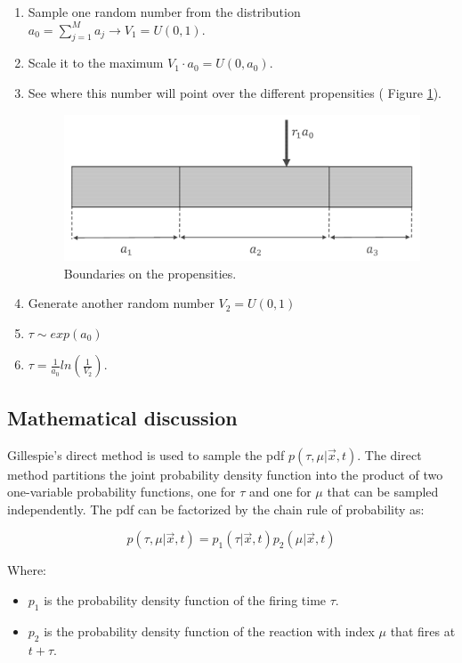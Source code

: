\begin{enumerate}
  \item Sample one random number from the distribution $a_0 = \sum_{j=1}^{M}{a_j}\rightarrow V_1=U(0,1)$.
  \item Scale it to the maximum $V_1 \cdot a_0 =U(0,a_0)$.
  \item See where this number will point over the different propensities ( Figure \ref{fig:boundaries}).

    \begin{figure}[H]
      \centering
      \includegraphics[width=\textwidth]{boundaries.png}
      \caption{Boundaries on the propensities.}
      \label{fig:boundaries}
    \end{figure}

  \item Generate another random number $V_2 =U(0,1)$ \item $\tau \sim exp(a_0)$ \item $\tau = \frac{1}{a_0}ln(\frac{1}{V_2})$.
\end{enumerate}

  \subsection{Mathematical discussion}
  Gillespie's direct method is used to sample the pdf $p(\tau, \mu|\vec{x},t)$.
  The direct method partitions the joint probability density function into the product of two one-variable probability functions, one for $\tau$ and one for $\mu$ that can be sampled independently.
  The pdf can be factorized by the chain rule of probability as:

  $$p(\tau, \mu|\vec{x},t) = p_1(\tau|\vec{x},t)p_2(\mu|\vec{x},t)$$

  Where:

  \begin{multicols}{2}
    \begin{itemize}
      \item $p_1$ is the probability density function of the firing time $\tau$.
      \item $p_2$ is the probability density function of the reaction with index $\mu$ that fires at $t+\tau$.
    \end{itemize}
  \end{multicols}

